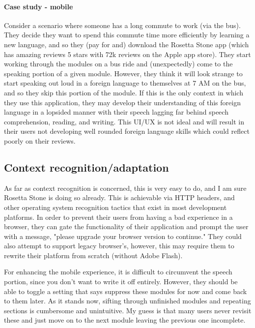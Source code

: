 \paragraph{Case study - mobile}
Consider a scenario where someone has a long commute to work (via the bus). They decide they want to spend this commute time more efficiently by learning a new language, and so they (pay for and) download the Rosetta Stone app (which has amazing reviews 5 stars with 72k reviews on the Apple app store). They start working through the modules on a bus ride and (unexpectedly) come to the speaking portion of a given module. However, they think it will look strange to start speaking out loud in a foreign language to themselves at 7 AM on the bus, and so they skip this portion of the module. If this is the only context in which they use this application, they may develop their understanding of this foreign language in a lopsided manner with their speech lagging far behind speech comprehension, reading, and writing. This UI/UX is not ideal and will result in their users not developing well rounded foreign language skills which could reflect poorly on their reviews.

\subsection{Context recognition/adaptation}

As far as context recognition is concerned, this is very easy to do, and I am sure Rosetta Stone is doing so already. This is achievable via HTTP headers, and other operating system recognition tactics that exist in most development platforms. In order to prevent their users from having a bad experience in a browser, they can gate the functionality of their application and prompt the user with a message, "please upgrade your browser version to continue." They could also attempt to support legacy browser's, however, this may require them to rewrite their platform from scratch (without Adobe Flash).

For enhancing the mobile experience, it is difficult to circumvent the speech portion, since you don't want to write it off entirely. However, they should be able to toggle a setting that says suppress these modules for now and come back to them later. As it stands now, sifting through unfinished modules and repeating sections is cumbersome and unintuitive. My guess is that many users never revisit these and just move on to the next module leaving the previous one incomplete.

